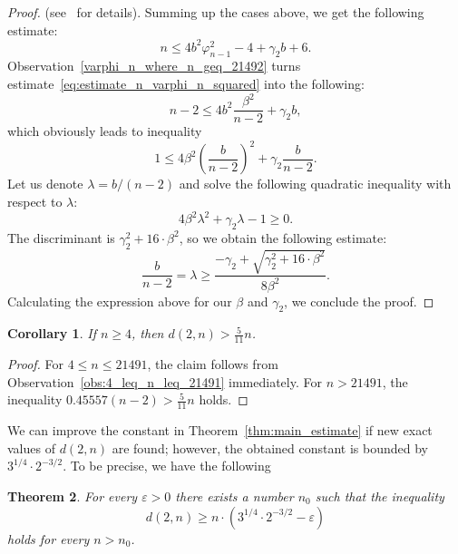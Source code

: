 \documentclass[a4paper,14pt]{article} %
\theoremstyle{plain}
\newtheorem{theorem}{Theorem}[section]
\newtheorem{corollary}[theorem]{Corollary}
\theoremstyle{definition}
\begin{document}
\begin{proof}
	(see~\cite{erdos1945integral} for details).
	Summing up the cases above, we get the following estimate:
	\begin{equation}
		\label{eq:estimate_n_varphi_n_squared}
		n \leq 4 b^2 \varphi_{n-1}^2 - 4 + \gamma_2 b + 6
		.
	\end{equation}
	Observation~\ref{varphi_n_where_n_geq_21492} turns estimate~\eqref{eq:estimate_n_varphi_n_squared}
	into the following:
	\begin{equation}
		\label{eq:estimate_n_sqrt_n-2}
		n-2 \leq 4 b^2 \frac{\beta^2}{n-2} + \gamma_2 b
		,
	\end{equation}
	which obviously leads to inequality
	\begin{equation}
		1 \leq 4\beta^2 \left(\frac{b}{n-2}\right)^2  + \gamma_2 \frac{b}{n-2}
		.
	\end{equation}
	Let us denote $\lambda = b/(n-2)$ and solve the following quadratic inequality with respect to $\lambda$:
	\begin{equation}
		\label{eq:square_inequality_lambda}
		4\beta^2 \lambda^2  + \gamma_2 \lambda - 1 \geq 0
		.
	\end{equation}
	The discriminant is $\gamma_2^2 + 16 \cdot \beta^2$,
	so we obtain the following estimate:
	\begin{equation}
		\frac{b}{n-2} = \lambda \geq \frac{-\gamma_2 + \sqrt{\gamma_2^2 + 16 \cdot \beta^2}}{8\beta^2}
		.
	\end{equation}
	Calculating the expression above for our $\beta$ and $\gamma_2$, we conclude the proof.
\end{proof}

\begin{corollary}
	If $n\geq 4$, then $d(2,n) > \frac{5}{11} n$.
\end{corollary}

\begin{proof}
	For $4 \leq n \leq 21491$, the claim follows from Observation~\ref{obs:4_leq_n_leq_21491} immediately.
	For $n > 21491$, the inequality $0.45557(n-2) > \frac{5}{11}n$ holds.
\end{proof}


We can improve the constant in Theorem~\ref{thm:main_estimate} if new exact values of $d(2,n)$ are found;
however, the obtained constant is bounded by $3^{1/4}\cdot2^{-3/2}$.
To be precise, we have the following

\begin{theorem}
	For every $\varepsilon > 0$ there exists a number $n_0$ such that the inequality
	\begin{equation}
		d(2,n) \geq n\cdot(3^{1/4}\cdot2^{-3/2} - \varepsilon)
	\end{equation}
	holds for every $n>n_0$.
\end{theorem}
\end{document}
